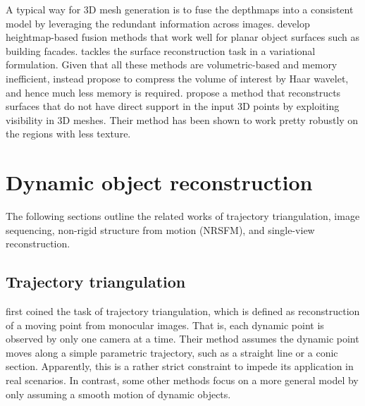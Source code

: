 A typical way for 3D mesh generation is to fuse the depthmaps into a consistent model by leveraging the redundant information across images. \citet{gallup20103d,gallup2010heightmap} develop heightmap-based fusion methods that work well for planar object surfaces such as building facades. \citet{zach2008fast} tackles the surface reconstruction task in a variational formulation.
Given that all these methods are volumetric-based and memory inefficient, \citet{zheng2012efficient} instead propose to compress the volume of interest by Haar wavelet, and hence much less memory is required. \citet{JAN} propose a method that reconstructs surfaces that do not have direct support in the input 3D points by exploiting visibility in 3D meshes. Their method has been shown to work pretty robustly on the regions with less texture.


\section{Dynamic object reconstruction}
The following sections outline the related works of trajectory triangulation, image sequencing, non-rigid structure from motion (NRSFM), and single-view reconstruction.

\subsection{Trajectory triangulation}
\citet{avidan2000trajectory} first coined the task of trajectory triangulation, which is defined as  reconstruction of a moving point from monocular images. That is, each dynamic point is observed by only one camera at a time. Their method assumes the dynamic point moves along a simple parametric trajectory, such as a straight line or a conic section. Apparently, this is a rather strict constraint to impede its application in real scenarios. 
In contrast, some other methods  \cite{Park_ECCV2010,Valmadre_CVPR2012,ZhuCL_CVPR11,park20153d} focus on a more general model by only assuming a smooth motion of dynamic objects.

